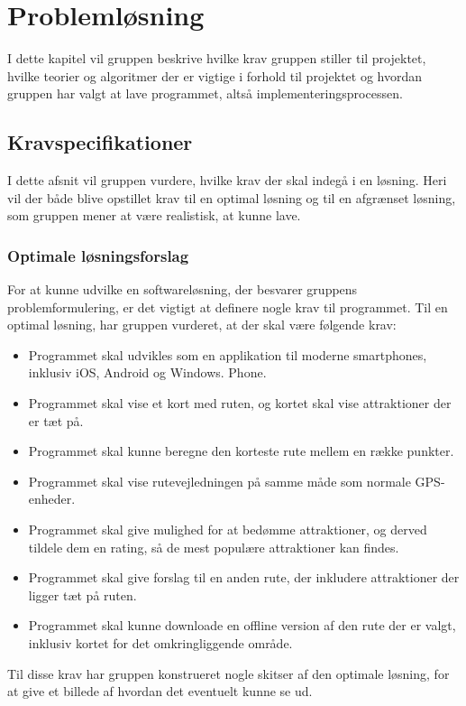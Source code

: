 \chapter{Problemløsning}
I dette kapitel vil gruppen beskrive hvilke krav gruppen stiller til projektet, hvilke teorier og algoritmer der er vigtige i forhold til projektet og hvordan gruppen har valgt at lave programmet, altså implementeringsprocessen.

\section{Kravspecifikationer}
I dette afsnit vil gruppen vurdere, hvilke krav der skal indegå i en løsning. Heri vil der både blive opstillet krav til en optimal løsning og til en afgrænset løsning, som gruppen mener at være realistisk, at kunne lave.

\subsection{Optimale løsningsforslag}
For at kunne udvilke en softwareløsning, der besvarer gruppens problemformulering, er det vigtigt at definere nogle krav til programmet. Til en optimal løsning, har gruppen vurderet, at der skal være følgende krav:
\begin{itemize}
	\item Programmet skal udvikles som en applikation til moderne smartphones, inklusiv iOS, Android og Windows. Phone. 
	\item Programmet skal vise et kort med ruten, og kortet skal vise attraktioner der er tæt på. 
	\item Programmet skal kunne beregne den korteste rute mellem en række punkter.
	\item Programmet skal vise rutevejledningen på samme måde som normale GPS-enheder. 
	\item Programmet skal give mulighed for at bedømme attraktioner, og derved tildele dem en rating, så de mest populære attraktioner kan findes. 
	\item Programmet skal give forslag til en anden rute, der inkludere attraktioner der ligger tæt på ruten.
	\item Programmet skal kunne  downloade en offline version af den rute der er valgt, inklusiv kortet for det omkringliggende område.
\end{itemize}
Til disse krav har gruppen konstrueret nogle skitser af den optimale løsning, for at give et billede af hvordan det eventuelt kunne se ud. \newpage

